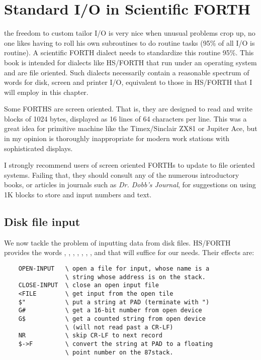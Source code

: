 \section{Standard I/O in Scientific FORTH}

 the freedom to custom tailor I/O is very nice when unusual problems crop up, no one likes having to roll his own subroutines to do routine tasks (95\% of all I/O is routine). A scientific FORTH dialect needs to standardize this routine 95\%. This book is intended for dialects like HS/FORTH that run under an operating system and are file oriented. Such dialects necessarily contain a reasonable spectrum of words for disk, screen and printer I/O, equivalent to those in HS/FORTH that I will employ in this chapter.

Some FORTHS are screen oriented. That is, they are designed to read and write blocks of 1024 bytes, displayed as 16 lines of 64 characters per line. This was a great idea for primitive machine like the Timex/Sinclair ZX81 or Jupiter Ace, but in my opinion is thoroughly inappropriate for modern work stations with sophisticated displays.

I strongly recommend users of screen oriented FORTHs to update to file oriented systems. Failing that, they should consult any of the numerous introductory books, or articles in journals such as \textit{Dr. Dobb's Journal}, for suggestions on using 1K blocks to store and input numbers and text.

\subsection{Disk file input}
We now tackle the problem of inputting data from disk files.
HS/FORTH provides the words , , , , , , , and  that will suffice for our needs. Their effects are:

\begin{lstlisting}
    OPEN-INPUT   \ open a file for input, whose name is a
                 \ string whose address is on the stack.
    CLOSE-INPUT  \ close an open input file
    <FILE        \ get input from the open tile
    $"           \ put a string at PAD (terminate with ")
    G#           \ get a 16-bit number from open device
    G$           \ get a counted string from open device
                 \ (will not read past a CR-LF)
    NR           \ skip CR-LF to next record
    $->F         \ convert the string at PAD to a floating
                 \ point number on the 87stack.
\end{lstlisting}

